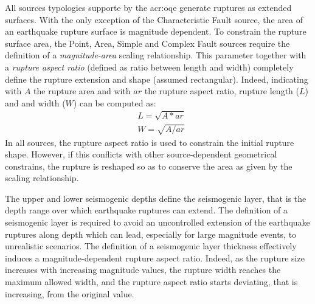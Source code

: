 All sources typologies supporte by the \gls{acr:oqe} generate ruptures as
extended surfaces. With the only exception of the Characteristic Fault source,
the area of an earthquake rupture surface is magnitude dependent. To constrain
the rupture surface area, the Point, Area, Simple and Complex Fault sources
require the definition of a \textit{magnitude-area} scaling relationship.
This parameter together with a \textit{rupture aspect ratio} (defined as ratio
between length and width) completely define the rupture extension and shape
(assumed rectangular). Indeed, indicating with $A$ the rupture area and with
$ar$ the rupture aspect ratio, rupture length ($L$) and and width ($W$) can be
computed as:
\begin{equation}
\begin{split} \label{eq:rup_l_w}
&L = \sqrt{A * ar}  \\
&W = \sqrt{A / ar}
\end{split}
\end{equation}
In all sources, the rupture aspect ratio is used to constrain the initial
rupture shape. However, if this conflicts with other source-dependent
geometrical constrains, the rupture is reshaped so as to conserve the area as
given by the scaling relationship.

The upper and lower seismogenic depths define the seismogenic layer, that is the
depth range over which earthquake ruptures can extend. The definition of a
seismogenic layer is required to avoid an uncontrolled extension of the
earthquake ruptures along depth which can lead, especially for large magnitude
events, to unrealistic scenarios. The definition of a seismogenic layer
thickness effectively induces a magnitude-dependent rupture aspect ratio.
Indeed, as the rupture size increases with increasing magnitude values, the
rupture width reaches the maximum allowed width, and the rupture aspect ratio
starts deviating, that is increasing, from the original value.

